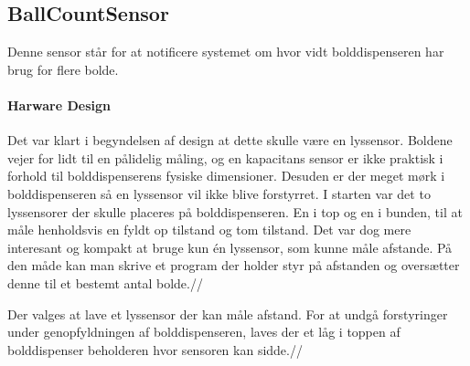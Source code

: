 \documentclass[Rapport/Rapport_main.tex]{subfiles}
\begin{document}
\subsection{BallCountSensor}\label{sec:BallCountSensor}
Denne sensor står for at notificere systemet om hvor vidt bolddispenseren har brug for flere bolde.

\paragraph{Harware Design}
\newline\newline
Det var klart i begyndelsen af design at dette skulle være en lyssensor. Boldene vejer for lidt til en pålidelig måling, og en kapacitans sensor er ikke praktisk i forhold til bolddispenserens fysiske dimensioner. Desuden er der meget mørk i bolddispenseren så en lyssensor vil ikke blive forstyrret. I starten var det to lyssensorer der skulle placeres på bolddispenseren. En i top og en i bunden, til at måle henholdsvis en fyldt op tilstand og tom tilstand. Det var dog mere interesant og kompakt at bruge kun én lyssensor, som kunne måle afstande. På den måde kan man skrive et program der holder styr på afstanden og oversætter denne til et bestemt antal bolde.//

Der valges at lave et lyssensor der kan måle afstand. For at undgå forstyringer under genopfyldningen af bolddispenseren, laves der et låg i toppen af bolddispenser beholderen hvor sensoren kan sidde.//
\end{document}
